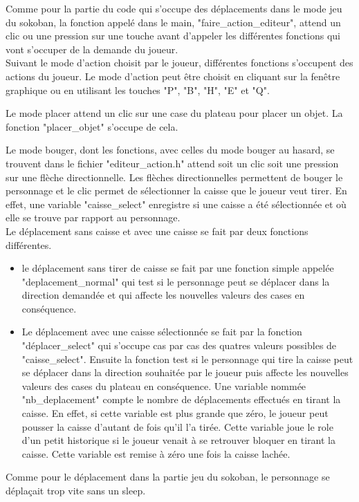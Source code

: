\documentclass{report}
\begin{document}
Comme pour la partie du code qui s'occupe des déplacements dans le mode jeu du sokoban, la fonction appelé dans le main, "faire\_action\_editeur", attend un clic ou une pression sur une touche avant d'appeler les différentes fonctions qui vont s'occuper de la demande du joueur.\\
Suivant le mode d'action choisit par le joueur, différentes fonctions s'occupent des actions du joueur. Le mode d'action peut être choisit en cliquant sur la fenêtre graphique ou en utilisant les touches "P", "B", "H", "E" et "Q".


Le mode placer attend un clic sur une case du plateau pour placer un objet. La fonction "placer\_objet" s'occupe de cela.


Le mode bouger, dont les fonctions, avec celles du mode bouger au hasard, se trouvent dans le fichier "editeur\_action.h" attend soit un clic soit une pression sur une flèche directionnelle.
Les flèches directionnelles permettent de bouger le personnage et le clic permet de sélectionner la caisse que le joueur veut tirer.
En effet, une variable "caisse\_select" enregistre si une caisse a été sélectionnée et où elle se trouve par rapport au personnage.\\
Le déplacement sans caisse et avec une caisse se fait par deux fonctions différentes.
\begin{itemize}
\item le déplacement sans tirer de caisse se fait par une fonction simple appelée "deplacement\_normal" qui test si le personnage peut se déplacer dans la direction demandée et qui affecte les nouvelles valeurs des cases en conséquence.
\item Le déplacement avec une caisse sélectionnée se fait par la fonction "déplacer\_select" qui s'occupe cas par cas des quatres valeurs possibles de "caisse\_select". 
Ensuite la fonction test si le personnage qui tire la caisse peut se déplacer dans la direction souhaitée par le joueur puis affecte les nouvelles valeurs des cases du plateau en conséquence.
Une variable nommée "nb\_deplacement" compte le nombre de déplacements effectués en tirant la caisse. En effet, si cette variable est plus grande que zéro, le joueur peut pousser la caisse d'autant de fois qu'il l'a tirée.
Cette variable joue le role d'un petit historique si le joueur venait à se retrouver bloquer en tirant la caisse. Cette variable est remise à zéro une fois la caisse lachée.
\end{itemize}
Comme pour le déplacement dans la partie jeu du sokoban, le personnage se déplaçait trop vite sans un sleep.\\
\end{document}
